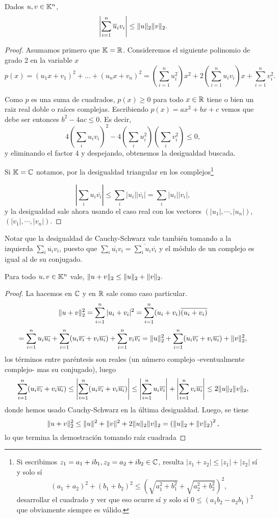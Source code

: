 \begin{proposicion}
\label{prop:CS}
Dados $\ub, \vb \in \K^n$,
$$
\left|\sum_{i=1}^{n} \overline u_{i}v_{i}\right|\leq \|\ub\|_2\|\vb\|_2.
$$
\end{proposicion}
\begin{proof}
Asumamos primero que $\mathbb K=\mathbb R$. Consideremos el siguiente polinomio de grado 2 en la variable $x$
$$
p(x) = (u_1 x + v_1)^2 + \dots + (u_n x +v_n)^2  =\left(\sum _{i=1}^nu_{i}^{2}\right)x^{2}+2\left(\sum _{i=1}^nu_{i}v_{i}\right)x+\sum _{i=1}^nv_{i}^{2}.
$$

Como $p$ es una suma de cuadrados, $p(x) \ge 0$ para todo $x \in \mathbb R$  tiene o bien un raiz real doble o raíces complejas. Escribiendo $p(x)=ax^2 + bx + c$ vemos que debe ser entonces $b^2-4ac \le 0$. Es decir,
$$
4 \left(\sum _{i}u_{i}v_{i}\right)^{2}- 4 \left(\sum _{i}{u_{i}^{2}}\right)\left(\sum _{i}{v_{i}^{2}}\right)\leq 0,
$$
y eliminando el factor 4 y despejando, obtenemos la desigualdad buscada.

Si $\mathbb K=\mathbb C$ notamos, por la desigualdad triangular en los complejos\footnote{Si escribimos $z_1=a_1+ib_1,z_2=a_2+ib_2\in \mathbb C$, resulta
$|z_1+z_2|\le|z_1|+|z_2|$ sí y solo sí
$$(a_1+a_2)^2+(b_1+b_2)^2\le \left(\sqrt{a_1^2+b_1^2}+\sqrt{a_2^2+b_2^2}\right)^2,$$ desarrollar el cuadrado y ver que eso ocurre sí y solo sí $0\le(a_1b_2-a_2b_1)^2$ que obviamente siempre es válido.}


$$
\left|\sum _{i}u_{i}\overline{v_{i}}\right|\le \sum _{i}|u_{i}||\overline{v_{i}}|=\sum _{i}|u_{i}||{v_{i}}|,
$$
y la desigualdad sale ahora usando el caso real con los vectores $(|u_1|,\cdots,|u_n|)$,$(|v_1|,\cdots,|v_n|)$.
\end{proof}
\begin{observacion}
Notar que la desigualdad de Cauchy-Schwarz vale también tomando a la izquierda
$\sum _{i}\overline{u_{i}}{v_{i}}$, puesto que $\sum _{i}\overline{u_{i}}{v_{i}}=\overline{\sum _{i}u_{i}\overline{v_{i}}}$ y el módulo de un complejo es igual al de su conjugado.
\end{observacion}
\begin{corolario}
 Para todo $\ub,\vb\in \K^n$ vale,
 $\|\ub+\vb\|_2\le\|\ub\|_2+\|\vb\|_2.$
\end{corolario}
\begin{proof}
La hacemos en $\mathbb C$ y en $\mathbb R$  sale como caso particular.
$$
\|\ub+\vb\|_2^2=
\sum_{i=1}^n |u_i+v_i|^2=\sum_{i=1}^n (u_i+v_i)\overline{(u_i+v_i)}
$$
$$
=\sum_{i=1}^n u_i\overline{u_i}+
\sum_{i=1}^n(u_i\overline{v_i}+v_i\overline{u_i})+\sum_{i=1}^n v_i\overline{v_i}=\|\ub\|_2^2+\sum_{i=1}^n(u_i\overline{v_i}+v_i\overline{u_i})+\|\vb\|^2_2,
$$
los términos entre paréntesis son reales (un número complejo -eventualmente complejo- mas su conjugado), luego
$$
\sum_{i=1}^n(u_i\overline{v_i}+v_i\overline{u_i})\le
\left|\sum_{i=1}^n(u_i\overline{v_i}+v_i\overline{u_i})\right|\le\left|\sum_{i=1}^nu_i\overline{v_i}\right|+\left|\sum_{i=1}^nv_i\overline{u_i}\right| \le 2\|\ub\|_2\|\vb\|_2,
$$
donde hemos usado Cauchy-Schwarz en la última desigualdad.
Luego, se tiene
$$
\|\ub+\vb\|_2^2\le \|\ub\|^2+\|\vb\|^2+2\|\ub\|_2\|\vb\|_2=
\left(\|\ub\|_2+\|\vb\|_2\right)^2,
$$
lo que termina la demostración tomando raíz cuadrada \end{proof}
